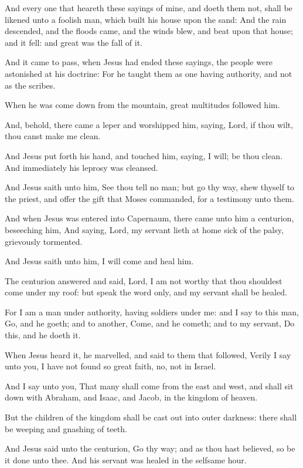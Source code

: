 \Verse And every one that heareth these sayings of mine, and doeth them not, shall be likened unto a foolish man, which built his house upon the sand: \Verse And the rain descended, and the floods came, and the winds blew, and beat upon that house; and it fell: and great was the fall of it.

\Verse And it came to pass, when Jesus had ended these sayings, the people were astonished at his doctrine: \Verse For he taught them as one having authority, and not as the scribes.


\Chapter
\Verse When he was come down from the mountain, great multitudes followed him.

\Verse And, behold, there came a leper and worshipped him, saying, Lord, if thou wilt, thou canst make me clean.

\Verse And Jesus put forth his hand, and touched him, saying, I will; be thou clean. And immediately his leprosy was cleansed.

\Verse And Jesus saith unto him, See thou tell no man; but go thy way, shew thyself to the priest, and offer the gift that Moses commanded, for a testimony unto them.

\Verse And when Jesus was entered into Capernaum, there came unto him a centurion, beseeching him, \Verse And saying, Lord, my servant lieth at home sick of the palsy, grievously tormented.

\Verse And Jesus saith unto him, I will come and heal him.

\Verse The centurion answered and said, Lord, I am not worthy that thou shouldest come under my roof: but speak the word only, and my servant shall be healed.

\Verse For I am a man under authority, having soldiers under me: and I say to this man, Go, and he goeth; and to another, Come, and he cometh; and to my servant, Do this, and he doeth it.

\Verse When Jesus heard it, he marvelled, and said to them that followed, Verily I say unto you, I have not found so great faith, no, not in Israel.

\Verse And I say unto you, That many shall come from the east and west, and shall sit down with Abraham, and Isaac, and Jacob, in the kingdom of heaven.

\Verse But the children of the kingdom shall be cast out into outer darkness: there shall be weeping and gnashing of teeth.

\Verse And Jesus said unto the centurion, Go thy way; and as thou hast believed, so be it done unto thee. And his servant was healed in the selfsame hour.

